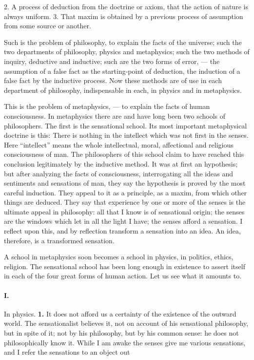 \documentclass[12pt]{article}
\begin{document}
2. A process of deduction from the doctrine or axiom, 
that the action of nature is always uniform. 3. That 
maxim is obtained by a previous process of assumption 
from some source or another. 

Such is the problem of philosophy, to explain the 
facts of the universe; such the two departments of 
philosophy, physics and metaphysics; such the two 
methods of inquiry, deductive and inductive; such are 
the two forms of error, --- the assumption of a false 
fact as the starting-point of deduction, the induction of 
a false fact by the inductive process. Now these methods are of use in each department of philosophy, indispensable in each, in physics and in metaphysics. 




This is the problem of metaphysics, --- to explain the 
facts of human consciousness. In metaphysics there 
are and have long been two schools of philosophers. 
The first is the sensational school. Its most important metaphysical doctrine is this: There is nothing in 
the intellect which was not first in the senses. Here 
``intellect'' means the whole intellectual, moral, affectional and religious consciousness of man. The 
philosophers of this school claim to have reached this 
conclusion legitimately by the inductive method. It 
was at first an hypothesis; but after analyzing the 
facts of consciousness, interrogating all the ideas and 
sentiments and sensations of man, they say the hypothesis is proved by the most careful induction. They 
appeal to it as a principle, as a maxim, from which 
other things are deduced. They say that experience 
by one or more of the senses is the ultimate appeal in 
philosophy: all that I know is of sensational origin; 
the senses are the windows which let in all the light I 
have; the senses afford a sensation. I reflect upon 
this, and by reflection transform a sensation into an 
idea. An idea, therefore, is a transformed sensation. 

A school in metaphysics soon becomes a school in 
physics, in politics, ethics, religion. The sensational 
school has been long enough in existence to assert itself 
in each of the four great forms of human action. Let 
us see what it amounts to. 

\paragraph{I.} In physics. \textbf{1.} It does not afford us a certainty 
of the existence of the outward world. The sensationalist believes it, not on account of his sensational 
philosophy, but in spite of it; not by his philosophy, 
but by his common sense: he does not philosophically 
know it. While I am awake the senses give me various 
sensations, and I refer the sensations to an object out 
\end{document}
